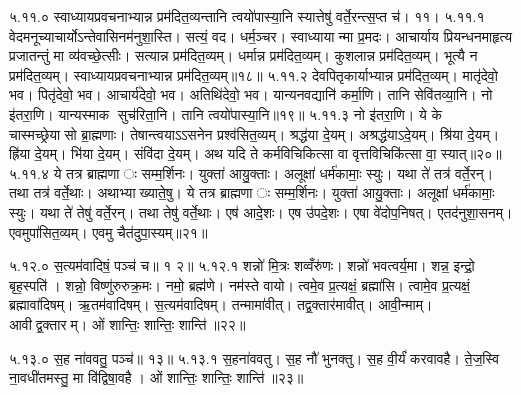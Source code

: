 ५.११.०
स्वाध्यायप्रवचनाभ्यान्न प्रम॑दित॒व्यन्तानि त्वयो॑पास्या॒नि स्यात्तेषु॑ वर्ते॒रन्त्स॒प्त च॑। ११।
५.११.१
वेदमनूच्याचार्योऽन्तेवासिनम॑नुशा॒स्ति। सत्यं॒ वद। धर्म॒ञ्चर। स्वाध्यायान्मा प्र॒मदः। आचार्याय प्रियन्धनमाहृत्य प्रजातन्तुं मा व्य॑वच्छे॒त्सीः। सत्यान्न प्रम॑दित॒व्यम्। धर्मान्न प्रम॑दित॒व्यम्। कुशलान्न प्रम॑दित॒व्यम्। भूत्यै न प्रम॑दित॒व्यम्। स्वाध्यायप्रवचनाभ्यान्न प्रम॑दित॒व्यम्॥१८॥
५.११.२
देवपितृकार्याभ्यान्न प्रम॑दित॒व्यम्। मातृ॑देवो॒ भव। पितृ॑देवो॒ भव। आचार्य॑देवो॒ भव। अतिथि॑देवो॒ भव। यान्यनवद्यानि॑ कर्मा॒णि। तानि सेवि॑तव्या॒नि। नो इ॑तरा॒णि। यान्यस्माक सुच॑रिता॒नि। तानि त्वयो॑पास्या॒नि॥१९॥
५.११.३
नो इ॑तरा॒णि। ये के चास्मच्छ्रेयासो ब्रा॒ह्मणाः। तेषान्त्वयाऽऽसनेन प्रश्व॑सित॒व्यम्। श्रद्ध॑या दे॒यम्। अश्रद्ध॑याऽदे॒यम्। श्रि॑या दे॒यम्। ह्रि॑या दे॒यम्। भि॑या दे॒यम्। संवि॑दा दे॒यम्। अथ यदि ते कर्मविचिकित्सा वा वृत्तविचिकि॑त्सा वा॒ स्यात्॥२०॥
५.११.४
ये तत्र ब्राह्मणाः सम्म॒र्\mbox{}शिनः। युक्ता॑ आयु॒क्ताः। अलूक्षा॑ धर्म॑कामाः॒ स्युः। यथा ते॑ तत्र॑ वर्ते॒रन्। तथा तत्र॑ वर्ते॒थाः। अथाभ्याख्याते॒षु। ये तत्र ब्राह्मणाः सम्म॒र्\mbox{}शिनः। युक्ता॑ आयु॒क्ताः। अलूक्षा॑ धर्म॑कामाः॒ स्युः। यथा ते॑ तेषु॑ वर्ते॒रन्। तथा तेषु॑ वर्ते॒थाः। एष॑ आदे॒शः। एष उ॑पदे॒शः। एषा वे॑दोप॒निषत्। एतद॑नुशा॒सनम्। एवमुपा॑सित॒व्यम्। एवमु चैत॑दुपा॒स्यम्॥२१॥
\anuvakamend

५.१२.०
स॒त्यम॑वादिषं॒ पञ्च॑ च॥ १ २॥
५.१२.१
शन्नो॑ मि॒त्रः  शव्वँरु॑णः। शन्नो॑ भवत्वर्य॒मा। शन्न॒ इन्द्रो॒ बृह॒स्पति॑। शन्नो॒ विष्णु॑रुरुक्र॒मः। नमो॒ ब्रह्म॑णे। नम॑स्ते वायो। त्वमे॒व प्र॒त्यक्षं॒ ब्रह्मा॑सि। त्वामे॒व प्र॒त्यक्षं॒ ब्रह्मावा॑दिषम्। ऋ॒तम॑वादिषम्। स॒त्यम॑वादिषम्। तन्मामा॑वीत्। तद्व॒क्तार॑मावीत्। आवी॒न्माम्। आवीद्व॒क्तारम्। ओं शान्तिः॒ शान्तिः॒ शान्ति॑॥२२॥

\setcounter{anuvakam}{0}
५.१३.०
स॒ह ना॑ववतु॒ पञ्च॑॥ १३॥
५.१३.१
स॒हना॑ववतु। स॒ह नौ॑ भुनक्तु। स॒ह वी॒र्यं॑ करवावहै। ते॒ज॒स्वि ना॒वधी॑तमस्तु॒ मा वि॑द्विषा॒वहै। ओं शान्तिः॒ शान्तिः॒ शान्ति॑॥२३॥
\anuvakamend

